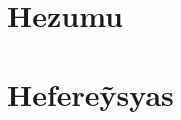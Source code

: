 \documentclass[12pt, a4paper]{article}
\begin{document}
\newpage
\section{Hezumu}

\newpage
\section{Hefere\~ysyas}
\end{document}
